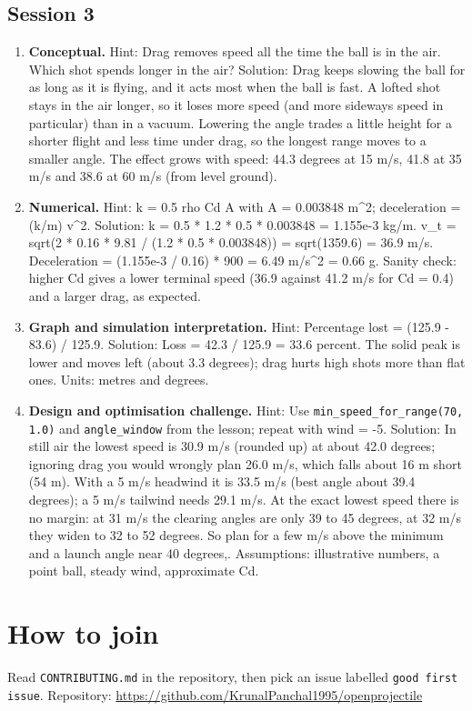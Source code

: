 \documentclass[11pt,a4paper]{article}
\begin{document}
\subsection*{Session 3}
\begin{enumerate}[nosep]
\item \textbf{Conceptual.} Hint: Drag removes speed all the time the ball is in the air. Which shot spends longer in the air? Solution: Drag keeps slowing the ball for as long as it is flying, and it acts most when the ball is fast. A lofted shot stays in the air longer, so it loses more speed (and more sideways speed in particular) than in a vacuum. Lowering the angle trades a little height for a shorter flight and less time under drag, so the longest range moves to a smaller angle. The effect grows with speed: 44.3 degrees at 15 m/s, 41.8 at 35 m/s and 38.6 at 60 m/s (from level ground).
\item \textbf{Numerical.} Hint: k = 0.5 rho Cd A with A = 0.003848 m\textasciicircum{}2; deceleration = (k/m) v\textasciicircum{}2. Solution: k = 0.5 * 1.2 * 0.5 * 0.003848 = 1.155e-3 kg/m. v\_t = sqrt(2 * 0.16 * 9.81 / (1.2 * 0.5 * 0.003848)) = sqrt(1359.6) = 36.9 m/s. Deceleration = (1.155e-3 / 0.16) * 900 = 6.49 m/s\textasciicircum{}2 = 0.66 g. Sanity check: higher Cd gives a lower terminal speed (36.9 against 41.2 m/s for Cd = 0.4) and a larger drag, as expected.
\item \textbf{Graph and simulation interpretation.} Hint: Percentage lost = (125.9 - 83.6) / 125.9. Solution: Loss = 42.3 / 125.9 = 33.6 percent. The solid peak is lower and moves left (about 3.3 degrees); drag hurts high shots more than flat ones. Units: metres and degrees.
\item \textbf{Design and optimisation challenge.} Hint: Use \texttt{min\_speed\_for\_range(70, 1.0)} and \texttt{angle\_window} from the lesson; repeat with wind = -5. Solution: In still air the lowest speed is 30.9 m/s (rounded up) at about 42.0 degrees; ignoring drag you would wrongly plan 26.0 m/s, which falls about 16 m short (54 m). With a 5 m/s headwind it is 33.5 m/s (best angle about 39.4 degrees); a 5 m/s tailwind needs 29.1 m/s. At the exact lowest speed there is no margin: at 31 m/s the clearing angles are only 39 to 45 degrees, at 32 m/s they widen to 32 to 52 degrees. So plan for a few m/s above the minimum and a launch angle near 40 degrees,. Assumptions: illustrative numbers, a point ball, steady wind, approximate Cd.
\end{enumerate}

\section{How to join}
Read \texttt{CONTRIBUTING.md} in the repository, then pick an issue labelled \texttt{good first issue}. Repository: \url{https://github.com/KrunalPanchal1995/openprojectile}
\end{document}
